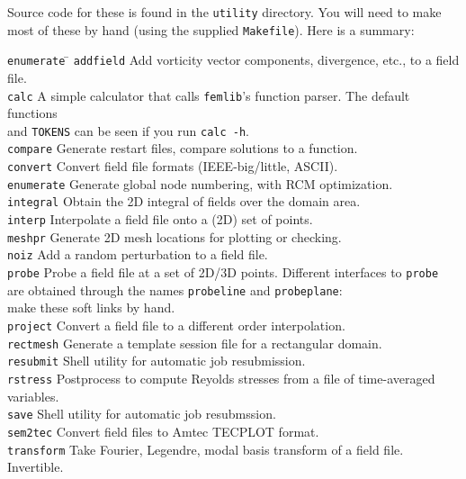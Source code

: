 \documentclass[11pt,a4paper]{report}
\begin{document}
Source code for these is found in the \texttt{utility} directory. You
will need to make most of these by hand (using the supplied
\texttt{Makefile}).  Here is a summary:
\begin{tabbing}
\texttt{enumerate}  \= \kill
\texttt{addfield} \>   
        Add vorticity vector components, divergence, etc., to a field
	file.\\
\texttt{calc} \>      
        A simple calculator that calls \verb+femlib+'s function
        parser. The default functions\\\>and \texttt{TOKENS} can be seen
        if you run \texttt{calc -h}.\\
\texttt{compare} \>   
        Generate restart files, compare solutions to a function.\\
\texttt{convert} \>   
        Convert field file formats (IEEE-big/little, ASCII).\\
\texttt{enumerate}  \>
        Generate global node numbering, with RCM optimization.\\
\texttt{integral} \> Obtain the 2D integral of fields over the
        domain area.\\
\texttt{interp} \>   
        Interpolate a field file onto a (2D) set of points.\\
\texttt{meshpr} \>    
        Generate 2D mesh locations for plotting or checking.\\
\texttt{noiz} \>      
        Add a random perturbation to a field file.\\
\texttt{probe} \>   
        Probe a field file at a set of 2D/3D points. Different
        interfaces to \texttt{probe}\\ \> are obtained through the names
        \texttt{probeline} and \texttt{probeplane}: \\ \> make these soft
        links by hand.\\
\texttt{project} \>   
        Convert a field file to a different order interpolation.\\
\texttt{rectmesh} \>
        Generate a template session file for a rectangular domain.\\
\texttt{resubmit} \> Shell utility for automatic job resubmission.\\
\texttt{rstress} \>
	Postprocess to compute Reyolds stresses from a file of
        time-averaged variables.\\
\texttt{save} \> Shell utility for automatic job resubmssion.\\
\texttt{sem2tec} \>   
        Convert field files to Amtec TECPLOT format.\\
\texttt{transform} \>      
        Take Fourier, Legendre, modal basis transform of a field
	file. Invertible.\\
\end{tabbing}
\end{document}
